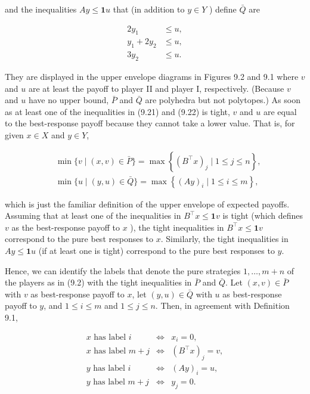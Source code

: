 \documentclass[12pt]{article}
\begin{document}
and the inequalities $A y \leq \mathbf{1} u$ that (in addition to $y \in Y$ ) define $\bar{Q}$ are


\begin{align*}
2 y_{1} & \leq u, \\
y_{1}+2 y_{2} & \leq u,  \tag{9.22}\\
3 y_{2} & \leq u .
\end{align*}


They are displayed in the upper envelope diagrams in Figures 9.2 and 9.1 where $v$ and $u$ are at least the payoff to player II and player I, respectively. (Because $v$ and $u$ have no upper bound, $\bar{P}$ and $\bar{Q}$ are polyhedra but not polytopes.) As soon as at least one of the inequalities in (9.21) and (9.22) is tight, $v$ and $u$ are equal to the best-response payoff because they cannot take a lower value. That is, for given $x \in X$ and $y \in Y$,

$$
\begin{aligned}
& \min \{v \mid(x, v) \in \bar{P}\}=\max \left\{\left(B^{\top} x\right)_{j} \mid 1 \leq j \leq n\right\}, \\
& \min \{u \mid(y, u) \in \bar{Q}\}=\max \left\{(A y)_{i} \mid 1 \leq i \leq m\right\},
\end{aligned}
$$

which is just the familiar definition of the upper envelope of expected payoffs. Assuming that at least one of the inequalities in $B^{\top} x \leq \mathbf{1} v$ is tight (which defines $v$ as the best-response payoff to $x$ ), the tight inequalities in $B^{\top} x \leq \mathbf{1} v$ correspond to the pure best responses to $x$. Similarly, the tight inequalities in $A y \leq \mathbf{1} u$ (if at least one is tight) correspond to the pure best responses to $y$.

Hence, we can identify the labels that denote the pure strategies $1, \ldots, m+n$ of the players as in (9.2) with the tight inequalities in $\bar{P}$ and $\bar{Q}$. Let $(x, v) \in \bar{P}$ with $v$ as best-response payoff to $x$, let $(y, u) \in \bar{Q}$ with $u$ as best-response payoff to $y$, and $1 \leq i \leq m$ and $1 \leq j \leq n$. Then, in agreement with Definition 9.1,

\[
\begin{array}{llr}
x \text { has label } i & \Leftrightarrow & x_{i}=0, \\
x \text { has label } m+j & \Leftrightarrow & \left(B^{\top} x\right)_{j}=v,  \tag{9.23}\\
y \text { has label } i & \Leftrightarrow & (A y)_{i}=u, \\
y \text { has label } m+j & \Leftrightarrow & y_{j}=0 .
\end{array}
\]
\end{document}
